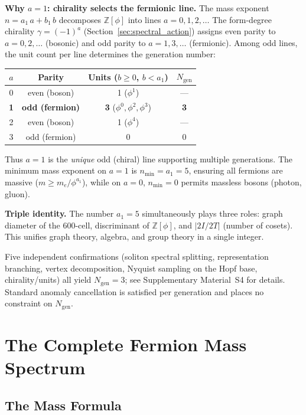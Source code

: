 \documentclass[12pt,a4paper]{article}
\theoremstyle{definition}
\begin{document}
\textbf{Why $a = 1$: chirality selects the fermionic line.}  The mass exponent $n = a_1\,a + b_1\,b$ decomposes $\mathbb{Z}[\phi]$ into lines $a = 0, 1, 2, \ldots$  The form-degree chirality $\gamma = (-1)^a$ (Section~\ref{sec:spectral_action}) assigns even parity to $a = 0, 2, \ldots$ (bosonic) and odd parity to $a = 1, 3, \ldots$ (fermionic).  Among odd lines, the unit count per line determines the generation number:
\begin{center}
\begin{tabular}{cccc}
\toprule
$a$ & Parity & Units ($b \geq 0$, $b < a_1$) & $N_{\text{gen}}$ \\
\midrule
0 & even (boson) & 1 ($\phi^1$) & --- \\
\textbf{1} & \textbf{odd (fermion)} & \textbf{3} ($\phi^0, \phi^2, \phi^3$) & \textbf{3} \\
2 & even (boson) & 1 ($\phi^4$) & --- \\
3 & odd (fermion) & 0 & 0 \\
\bottomrule
\end{tabular}
\end{center}
Thus $a = 1$ is the \emph{unique} odd (chiral) line supporting multiple generations.  The minimum mass exponent on $a = 1$ is $n_{\min} = a_1 = 5$, ensuring all fermions are massive ($m \geq m_e/\phi^{a_1}$), while on $a = 0$, $n_{\min} = 0$ permits massless bosons (photon, gluon).

\textbf{Triple identity.} The number $a_1 = 5$ simultaneously plays three roles: graph diameter of the 600-cell, discriminant of $\mathbb{Z}[\phi]$, and $|2I/2T|$ (number of cosets). This unifies graph theory, algebra, and group theory in a single integer.

Five independent confirmations (soliton spectral splitting, representation branching, vertex decomposition, Nyquist sampling on the Hopf base, chirality/units) all yield $N_{\text{gen}} = 3$; see Supplementary Material~S4 for details.  Standard anomaly cancellation is satisfied per generation and places no constraint on $N_{\text{gen}}$.



\section{The Complete Fermion Mass Spectrum}
\label{sec:masses}

\subsection{The Mass Formula}
\end{document}
